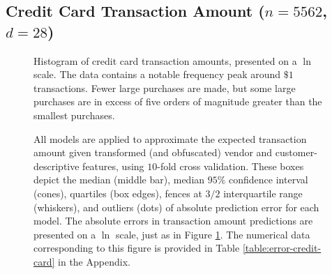 \documentclass[smallextended,final]{svjour3}  %
\begin{document}
\subsection{Credit Card Transaction Amount ($n = 5562$, $d = 28$)}

\begin{figure}
  \centering
  \caption{Histogram of credit card transaction amounts, presented on
    a $\ln$ scale. The data contains a notable frequency peak around
    $\$1$ transactions. Fewer large purchases are made, but some large
    purchases are in excess of five orders of magnitude greater than
    the smallest purchases.}
  \label{fig:hist-credit-card}
\end{figure}

\begin{figure}
  \centering
  \caption{All models are applied to approximate the expected
    transaction amount given transformed (and obfuscated) vendor and
    customer-descriptive features, using $10$-fold cross validation.
    These boxes depict the median (middle bar), median $95\%$
    confidence interval (cones), quartiles (box edges), fences at
    $3/2$ interquartile range (whiskers), and outliers (dots) of
    absolute prediction error for each model. The absolute errors in
    transaction amount predictions are presented on a $\ln$ scale,
    just as in Figure \ref{fig:hist-credit-card}. The numerical data
    corresponding to this figure is provided in Table
    \ref{table:error-credit-card} in the Appendix.}
  \label{fig:error-credit-card}
\end{figure}
\end{document}
